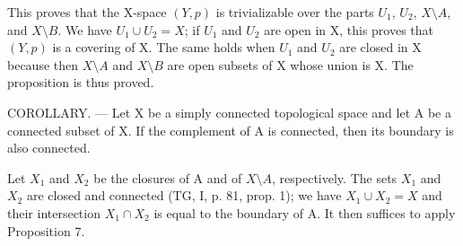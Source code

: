 This proves that the X-space \((Y,p)\) is trivializable over the parts \(U_{1}\), \(U_{2}\), \(X\setminus A\), and \(X\setminus B\). We have \(U_{1} \cup U_{2} = X\); if \(U_{1}\) and \(U_{2}\) are open in X, this proves that \((Y,p)\) is a covering of X. The same holds when \(U_{1}\) and \(U_{2}\) are closed in X because then \(X\setminus A\) and \(X\setminus B\) are open subsets of X whose union is X. The proposition is thus proved.

COROLLARY. --- Let X be a simply connected topological space and let A be a connected subset of X. If the complement of A is connected, then its boundary is also connected.

Let \(X_{1}\) and \(X_{2}\) be the closures of A and of \(X\setminus A\), respectively. The sets \(X_{1}\) and \(X_{2}\) are closed and connected (TG, I, p. 81, prop. 1); we have \(X_{1} \cup X_{2} = X\) and their intersection \(X_{1} \cap X_{2}\) is equal to the boundary of A. It then suffices to apply Proposition 7.
